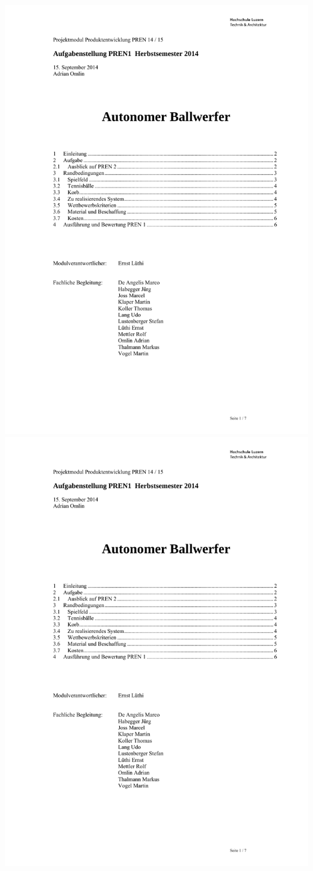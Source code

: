 		\includegraphics[page=6,width=\textwidth]{Enddokumentation/Anhang/Extern/Aufgabenstellung_PREN1_H14.pdf}
		\newpage
		\includegraphics[page=7,width=\textwidth]{Enddokumentation/Anhang/Extern/Aufgabenstellung_PREN1_H14.pdf}
		
